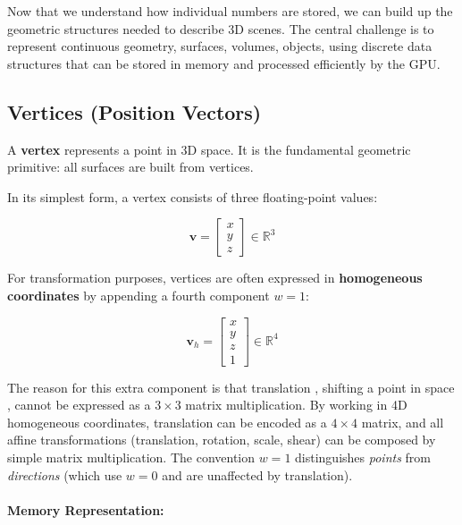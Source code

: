 \documentclass[11pt]{article}
\begin{document}
Now that we understand how individual numbers are stored, we can build up the geometric structures needed to describe 3D scenes. The central challenge is to represent continuous geometry, surfaces, volumes, objects, using discrete data structures that can be stored in memory and processed efficiently by the GPU.

\subsection{Vertices (Position Vectors)}

A \textbf{vertex} represents a point in 3D space. It is the fundamental geometric primitive: all surfaces are built from vertices.

In its simplest form, a vertex consists of three floating-point values:

\begin{equation}
    \mathbf{v} =
    \begin{bmatrix}
        x \\
        y \\
        z
    \end{bmatrix}
    \in \mathbb{R}^3
\end{equation}

For transformation purposes, vertices are often expressed in \textbf{homogeneous coordinates} by appending a fourth component $w = 1$:

\begin{equation}
    \mathbf{v}_h =
    \begin{bmatrix}
        x \\
        y \\
        z \\
        1
    \end{bmatrix}
    \in \mathbb{R}^4
\end{equation}

The reason for this extra component is that translation , shifting a point in space , cannot be expressed as a $3 \times 3$ matrix multiplication. By working in 4D homogeneous coordinates, translation can be encoded as a $4 \times 4$ matrix, and all affine transformations (translation, rotation, scale, shear) can be composed by simple matrix multiplication. The convention $w = 1$ distinguishes \emph{points} from \emph{directions} (which use $w = 0$ and are unaffected by translation).

\paragraph{Memory Representation:}
\end{document}

